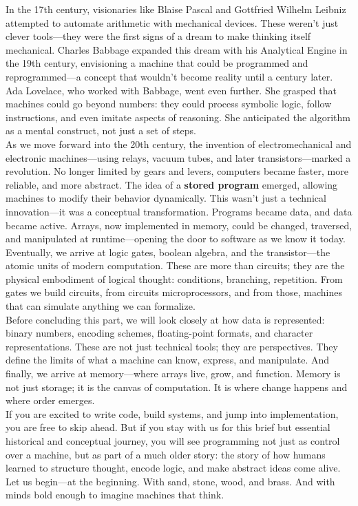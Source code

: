 \documentclass[12pt, oneside, openany]{book}
\begin{document}
In the 17th century, visionaries like Blaise Pascal and Gottfried Wilhelm Leibniz attempted to automate arithmetic with mechanical devices. These weren’t just clever tools—they were the first signs of a dream to make thinking itself mechanical. Charles Babbage expanded this dream with his Analytical Engine in the 19th century, envisioning a machine that could be programmed and reprogrammed—a concept that wouldn’t become reality until a century later. Ada Lovelace, who worked with Babbage, went even further. She grasped that machines could go beyond numbers: they could process symbolic logic, follow instructions, and even imitate aspects of reasoning. She anticipated the algorithm as a mental construct, not just a set of steps.\\
As we move forward into the 20th century, the invention of electromechanical and electronic machines—using relays, vacuum tubes, and later transistors—marked a revolution. No longer limited by gears and levers, computers became faster, more reliable, and more abstract. The idea of a \textbf{stored program} emerged, allowing machines to modify their behavior dynamically. This wasn’t just a technical innovation—it was a conceptual transformation. Programs became data, and data became active. Arrays, now implemented in memory, could be changed, traversed, and manipulated at runtime—opening the door to software as we know it today.\\
Eventually, we arrive at logic gates, boolean algebra, and the transistor—the atomic units of modern computation. These are more than circuits; they are the physical embodiment of logical thought: conditions, branching, repetition. From gates we build circuits, from circuits microprocessors, and from those, machines that can simulate anything we can formalize.\\
Before concluding this part, we will look closely at how data is represented: binary numbers, encoding schemes, floating-point formats, and character representations. These are not just technical tools; they are perspectives. They define the limits of what a machine can know, express, and manipulate. And finally, we arrive at memory—where arrays live, grow, and function. Memory is not just storage; it is the canvas of computation. It is where change happens and where order emerges.\\
If you are excited to write code, build systems, and jump into implementation, you are free to skip ahead. But if you stay with us for this brief but essential historical and conceptual journey, you will see programming not just as control over a machine, but as part of a much older story: the story of how humans learned to structure thought, encode logic, and make abstract ideas come alive.\\
Let us begin—at the beginning. With sand, stone, wood, and brass. And with minds bold enough to imagine machines that think.
\end{document}
